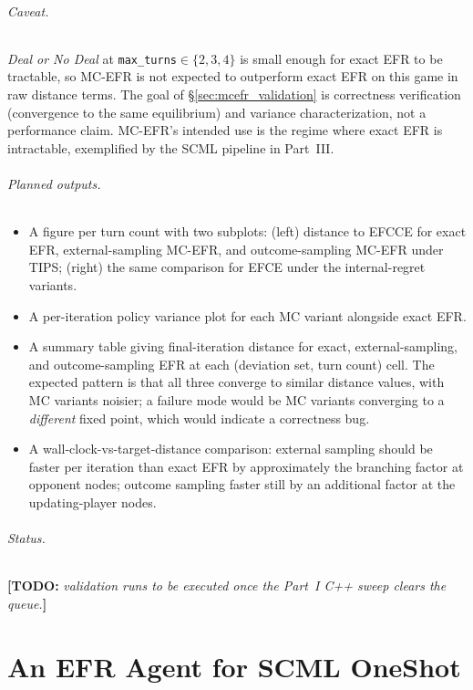 \documentclass[11pt]{article}
\newcommand{\todo}[1]{{\color{red!70!black}\textbf{[TODO: }\emph{#1}\textbf{]}}}
\begin{document}
\paragraph{Caveat.} \emph{Deal or No Deal} at \texttt{max\_turns}$\in\{2,3,4\}$ is small enough for exact EFR to be tractable, so MC-EFR is not expected to outperform exact EFR on this game in raw distance terms. The goal of \S\ref{sec:mcefr_validation} is correctness verification (convergence to the same equilibrium) and variance characterization, not a performance claim. MC-EFR's intended use is the regime where exact EFR is intractable, exemplified by the SCML pipeline in Part~III.

\paragraph{Planned outputs.}
\begin{itemize}
    \item A figure per turn count with two subplots: (left) distance to EFCCE for exact EFR, external-sampling MC-EFR, and outcome-sampling MC-EFR under TIPS; (right) the same comparison for EFCE under the internal-regret variants.
    \item A per-iteration policy variance plot for each MC variant alongside exact EFR.
    \item A summary table giving final-iteration distance for exact, external-sampling, and outcome-sampling EFR at each (deviation set, turn count) cell. The expected pattern is that all three converge to similar distance values, with MC variants noisier; a failure mode would be MC variants converging to a \emph{different} fixed point, which would indicate a correctness bug.
    \item A wall-clock-vs-target-distance comparison: external sampling should be faster per iteration than exact EFR by approximately the branching factor at opponent nodes; outcome sampling faster still by an additional factor at the updating-player nodes.
\end{itemize}

\paragraph{Status.} \todo{validation runs to be executed once the Part~I C++ sweep clears the queue.}

\newpage

\part{An EFR Agent for SCML OneShot}
\end{document}
